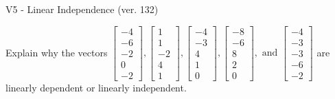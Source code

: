 \begin{exercise}
  \begin{exerciseTitle}V5 - Linear Independence (ver. 132)\end{exerciseTitle}
  \begin{exerciseStatement}
    Explain why the vectors \(\left[\begin{array}{r}
-4 \\
-6 \\
-2 \\
0 \\
-2
\end{array}\right] , \left[\begin{array}{r}
1 \\
1 \\
-2 \\
4 \\
1
\end{array}\right] , \left[\begin{array}{r}
-4 \\
-3 \\
4 \\
1 \\
0
\end{array}\right] , \left[\begin{array}{r}
-8 \\
-6 \\
8 \\
2 \\
0
\end{array}\right] , \text{ and } \left[\begin{array}{r}
-4 \\
-3 \\
-3 \\
-6 \\
-2
\end{array}\right]\) are linearly dependent or linearly independent.	



\end{exerciseStatement}
\end{exercise}
